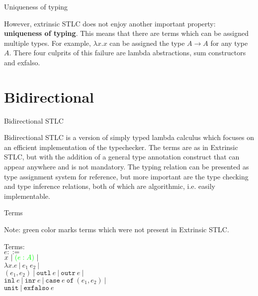 \documentclass{beamer}
\newcommand{\pipe}{\ |\ }
\newcommand{\Fun}[2]{#1 \to #2}
\newcommand{\annot}[2]{(#1 : #2)}
\newcommand{\fun}[2]{\lambda #1. #2}
\newcommand{\app}[2]{#1\ #2}
\newcommand{\pair}[2]{(#1, #2)}
\newcommand{\outl}[1][]{\texttt{outl}\ #1}
\newcommand{\outr}[1][]{\texttt{outr}\ #1}
\newcommand{\inl}[1][]{\texttt{inl}\ #1}
\newcommand{\inr}[1][]{\texttt{inr}\ #1}
\newcommand{\case}[3]{\texttt{case}\ #1\ \texttt{of}\ (#2, #3)}
\newcommand{\unit}{\texttt{unit}}
\newcommand{\exfalso}[1][]{\texttt{exfalso}\ #1}
\begin{document}
\begin{frame}{Uniqueness of typing}

However, extrinsic STLC does not enjoy another important property: \textbf{uniqueness of typing}. This means that there are terms which can be assigned multiple types. For example, $\fun{x}{x}$ can be assigned the type $\Fun{A}{A}$ for any type $A$. There four culprits of this failure are lambda abstractions, sum constructors and exfalso.

\end{frame}

\section{Bidirectional}

\newcommand{\newterm}[1]{\mathcolor{green}{#1}}

\begin{frame}{Bidirectional STLC}

Bidirectional STLC is a version of simply typed lambda calculus which focuses on an efficient implementation of the typechecker. The terms are as in Extrinsic STLC, but with the addition of a general type annotation construct that can appear anywhere and is not mandatory. The typing relation can be presented as type assignment system for reference, but more important are the type checking and type inference relations, both of which are algorithmic, i.e. easily implementable.

\end{frame}

\begin{frame}{Terms}

Note: green color marks terms which were not present in Extrinsic STLC.

\vspace{2em}

Terms: \\
$e ::=$ \\
\qquad $x \pipe \newterm{\annot{e}{A}} \pipe$ \\
\qquad $\fun{x}{e} \pipe \app{e_1}{e_2} \pipe$ \\
\qquad $\pair{e_1}{e_2} \pipe \outl[e] \pipe \outr[e] \pipe$ \\
\qquad $\inl[e] \pipe \inr[e] \pipe \case{e}{e_1}{e_2} \pipe$ \\
\qquad $\unit \pipe \exfalso{e}$

\end{frame}
\end{document}
